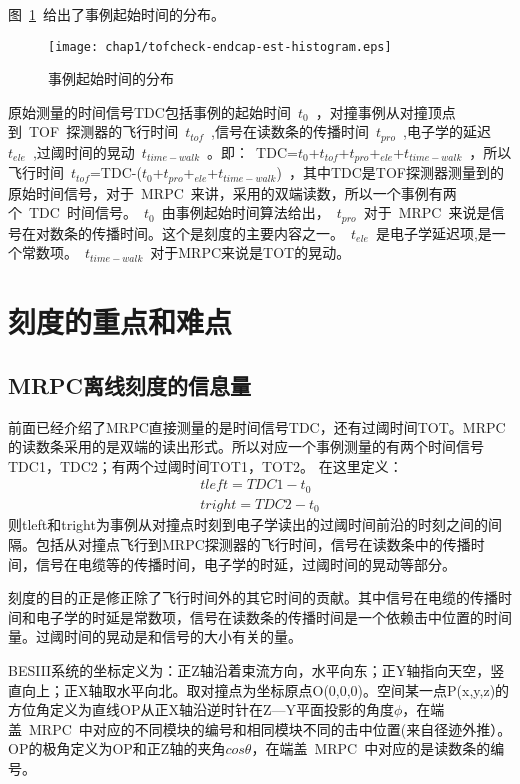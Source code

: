 图~\ref{fig:tofcheck-endcap-est-histogram}~给出了事例起始时间的分布。
\begin{figure}[!h]
  \centering
  \texttt{[image: chap1/tofcheck-endcap-est-histogram.eps]}
  \caption{事例起始时间的分布}
  \label{fig:tofcheck-endcap-est-histogram}
\end{figure}

原始测量的时间信号TDC包括事例的起始时间~$t_{0}$~，对撞事例从对撞顶点到~TOF~探测器的飞行时间~$t_{tof}$~,信号在读数条的传播时间~$t_{pro}$~,电子学的延迟~$t_{ele}$~,过阈时间的晃动~$t_{time-walk}$~。即：~TDC=$t_{0}$+$t_{tof}$+$t_{pro}$+$_{ele}$+$t_{time-walk}$~，所以飞行时间~$t_{tof}$=TDC-($t_{0}$+$t_{pro}$+$_{ele}$+$t_{time-walk}$)~，其中TDC是TOF探测器测量到的原始时间信号，对于~MRPC~来讲，采用的双端读数，所以一个事例有两个~TDC~时间信号。~$t_{0}$~由事例起始时间算法给出，~$t_{pro}$~对于~MRPC~来说是信号在对数条的传播时间。这个是刻度的主要内容之一。~$t_{ele}$~是电子学延迟项,是一个常数项。~$t_{time-walk}$~对于MRPC来说是TOT的晃动。
\section{刻度的重点和难点}
\subsection{MRPC离线刻度的信息量}
前面已经介绍了MRPC直接测量的是时间信号TDC，还有过阈时间TOT。MRPC的读数条采用的是双端的读出形式。所以对应一个事例测量的有两个时间信号TDC1，TDC2；有两个过阈时间TOT1，TOT2。
在这里定义：
\begin{align}
tleft=TDC1-t_{0}
\label{eq:tleft}\\
tright=TDC2-t_{0}
\label{eq:2}
\end{align}
则tleft和tright为事例从对撞点时刻到电子学读出的过阈时间前沿的时刻之间的间隔。包括从对撞点飞行到MRPC探测器的飞行时间，信号在读数条中的传播时间，信号在电缆等的传播时间，电子学的时延，过阈时间的晃动等部分。

刻度的目的正是修正除了飞行时间外的其它时间的贡献。其中信号在电缆的传播时间和电子学的时延是常数项，信号在读数条的传播时间是一个依赖击中位置的时间量。过阈时间的晃动是和信号的大小有关的量。

BESIII系统的坐标定义为：正Z轴沿着束流方向，水平向东；正Y轴指向天空，竖直向上；正X轴取水平向北。取对撞点为坐标原点O(0,0,0)。空间某一点P(x,y,z)的方位角定义为直线OP从正X轴沿逆时针在Z—Y平面投影的角度$\phi$，在端盖~MRPC~中对应的不同模块的编号和相同模块不同的击中位置(来自径迹外推）。OP的极角定义为OP和正Z轴的夹角$cos\theta$，在端盖~MRPC~中对应的是读数条的编号。

